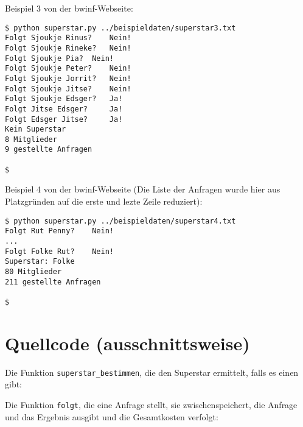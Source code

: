 \documentclass[a4paper,10pt,ngerman]{scrartcl}
\begin{document}
Beispiel 3 von der bwinf-Webseite:
\begin{lstlisting}
$ python superstar.py ../beispieldaten/superstar3.txt
Folgt Sjoukje Rinus? 	Nein!
Folgt Sjoukje Rineke? 	Nein!
Folgt Sjoukje Pia? 	Nein!
Folgt Sjoukje Peter? 	Nein!
Folgt Sjoukje Jorrit? 	Nein!
Folgt Sjoukje Jitse? 	Nein!
Folgt Sjoukje Edsger? 	Ja!
Folgt Jitse Edsger? 	Ja!
Folgt Edsger Jitse? 	Ja!
Kein Superstar
8 Mitglieder
9 gestellte Anfragen

$
\end{lstlisting}

Beispiel 4 von der bwinf-Webseite (Die Liste der Anfragen wurde hier aus Platzgründen auf die erste und lezte Zeile reduziert):
\begin{lstlisting}
$ python superstar.py ../beispieldaten/superstar4.txt
Folgt Rut Penny? 	Nein!
...
Folgt Folke Rut? 	Nein!
Superstar: Folke
80 Mitglieder
211 gestellte Anfragen

$
\end{lstlisting}

\clearpage

\section{Quellcode (ausschnittsweise)}

Die Funktion \texttt{superstar\_bestimmen}, die den Superstar ermittelt, falls es einen gibt:


\vspace{30pt}

Die Funktion \texttt{folgt}, die eine Anfrage stellt, sie zwischenspeichert, die Anfrage und das Ergebnis ausgibt und die Gesamtkosten verfolgt:

\end{document}

